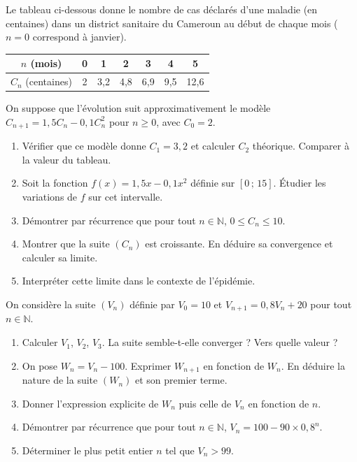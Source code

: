 \documentclass[11pt]{article}
\begin{document}
\begin{exercice}
Le tableau ci-dessous donne le nombre de cas déclarés d'une maladie (en centaines) dans un district sanitaire du Cameroun au début de chaque mois ($n=0$ correspond à janvier).

\begin{center}
\begin{tabular}{|c|c|c|c|c|c|c|}
\hline
$n$ (mois) & 0 & 1 & 2 & 3 & 4 & 5 \\ \hline
$C_n$ (centaines) & 2 & 3,2 & 4,8 & 6,9 & 9,5 & 12,6 \\ \hline
\end{tabular}
\end{center}
On suppose que l'évolution suit approximativement le modèle $C_{n+1} = 1,5 C_n - 0,1 C_n^2$ pour $n \ge 0$, avec $C_0 = 2$.
\begin{enumerate}
    \item Vérifier que ce modèle donne $C_1 = 3,2$ et calculer $C_2$ théorique. Comparer à la valeur du tableau.
    \item Soit la fonction $f(x) = 1,5x - 0,1x^2$ définie sur $[0\,;\,15]$. Étudier les variations de $f$ sur cet intervalle.
    \item Démontrer par récurrence que pour tout $n \in \mathbb{N}$, $0 \le C_n \le 10$.
    \item Montrer que la suite $(C_n)$ est croissante. En déduire sa convergence et calculer sa limite.
    \item Interpréter cette limite dans le contexte de l'épidémie.
\end{enumerate}
\end{exercice}

\begin{exercice}
On considère la suite $(V_n)$ définie par $V_0 = 10$ et $V_{n+1} = 0,8 V_n + 20$ pour tout $n \in \mathbb{N}$.
\begin{enumerate}
    \item Calculer $V_1$, $V_2$, $V_3$. La suite semble-t-elle converger ? Vers quelle valeur ?
    \item On pose $W_n = V_n - 100$. Exprimer $W_{n+1}$ en fonction de $W_n$. En déduire la nature de la suite $(W_n)$ et son premier terme.
    \item Donner l'expression explicite de $W_n$ puis celle de $V_n$ en fonction de $n$.
    \item Démontrer par récurrence que pour tout $n \in \mathbb{N}$, $V_n = 100 - 90 \times 0,8^n$.
    \item Déterminer le plus petit entier $n$ tel que $V_n > 99$.
\end{enumerate}
\end{exercice}
\end{document}

